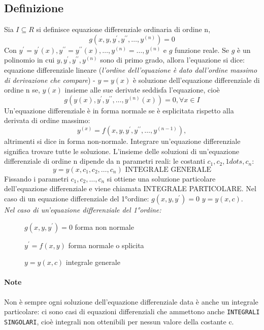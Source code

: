 \subsection{Definizione}
Sia $I\subseteq R$ si definisce {\color{blue} equazione differenziale ordinaria di ordine n}, 
\begin{equation*}
	g(x,y,y^\prime,y^{\prime\prime},\dots,y^{(n)})=0
\end{equation*}
Con $y^\prime=y^\prime(x),y^{\prime\prime}=y^{\prime\prime}(x),\dots,y^{(n)}=\dots,y^{(n)}$ e $g$ funzione reale.
Se $g$ è un polinomio in cui $y,y^\prime,y^{\prime\prime},y^{(n)}$ sono di primo grado, allora l'equazione si dice:
equazione differenziale lineare (\textit{l'ordine dell'equazione è dato dall'ordine massimo di derivazione che compare}) - $y=y(x)$ è soluzione dell'equazione differenziale di ordine n se, $y(x)$ insieme alle sue derivate seddisfa l'equazione, cioè
\begin{equation*}
	g(y(x),y^\prime, y^{\prime\prime},\dots, y^{(n)}(x))=0, \forall x \in I
\end{equation*}
Un'equazione differenziale è in forma normale se è esplicitata rispetto alla derivata di ordine massimo:
\begin{equation*}
	y^{(x)}=f(x,y,y^\prime,y^{\prime\prime},\dots,y^{(n-1)}),
\end{equation*}
altrimenti si dice in forma non-normale. Integrare un'equazione differenziale significa trovare tutte le soluzione. L'insieme delle soluzioni di un'equazione differenziale di ordine n dipende da n parametri reali: le costanti $c_1,c_2,1dots,c_n$: 
\begin{equation}
	y=y(x,c_1,c_2,\dots,c_n)\text{ INTEGRALE GENERALE}
\end{equation}
Fissando i parametri $c_1,c_2,\dots,c_n$ si ottiene una soluzione particolare dell'equazione differenziale e viene chiamata INTEGRALE PARTICOLARE. Nel caso di un equazione differenziale del 1°ordine: $g(x,y,y^\prime)=0$ $y=y(x,c)$.\\
\textit{Nel caso di un'equazione differenziale del 1°ordine:}
\begin{description}
	\item[ ] $g(x,y,y^\prime)=0$ forma non normale
	\item[ ] $y^\prime =f(x,y)$ forma normale o splicita
	\item[ ] $y=y(x,c)$ integrale generale 
\end{description}
\paragraph{\color{red}Note} Non è sempre ogni soluzione dell'equazione differenziale data è anche un integrale particolare: ci sono casi di equazioni differenziali che ammettono anche \texttt{INTEGRALI SINGOLARI}, cioè integrali non ottenibili per nessun valore della costante c.
